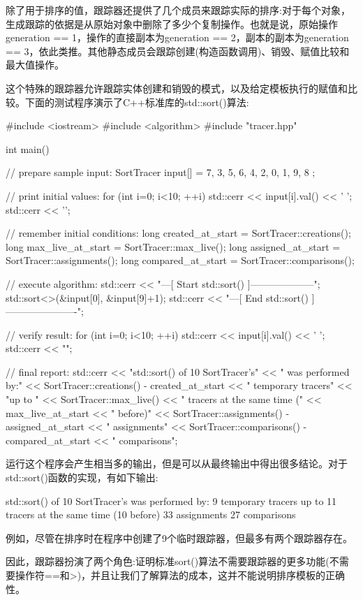 除了用于排序的值，跟踪器还提供了几个成员来跟踪实际的排序:对于每个对象，生成跟踪的依据是从原始对象中删除了多少个复制操作。也就是说，原始操作generation == 1，操作的直接副本为generation == 2，副本的副本为generation == 3，依此类推。其他静态成员会跟踪创建(构造函数调用)、销毁、赋值比较和最大值操作。

这个特殊的跟踪器允许跟踪实体创建和销毁的模式，以及给定模板执行的赋值和比较。下面的测试程序演示了C++标准库的std::sort()算法:

\begin{cpp}
#include <iostream>
#include <algorithm>
#include "tracer.hpp"

int main()
{
	// prepare sample input:
	SortTracer input[] = { 7, 3, 5, 6, 4, 2, 0, 1, 9, 8 };
	
	// print initial values:
	for (int i=0; i<10; ++i) {
		std::cerr << input[i].val() << ’ ’;
	}
	std::cerr << ’\n’;
	
	// remember initial conditions:
	long created_at_start = SortTracer::creations();
	long max_live_at_start = SortTracer::max_live();
	long assigned_at_start = SortTracer::assignments();
	long compared_at_start = SortTracer::comparisons();
	
	// execute algorithm:
	std::cerr << "---[ Start std::sort() ]--------------------\n";
	std::sort<>(&input[0], &input[9]+1);
	std::cerr << "---[ End std::sort() ]----------------------\n";
	
	// verify result:
	for (int i=0; i<10; ++i) {
		std::cerr << input[i].val() << ’ ’;
	}
	std::cerr << "\n\n";
	
	// final report:
	std::cerr << "std::sort() of 10 SortTracer’s"
			<< " was performed by:\n "
			<< SortTracer::creations() - created_at_start
			<< " temporary tracers\n "
			<< "up to "
			<< SortTracer::max_live()
			<< " tracers at the same time ("
			<< max_live_at_start << " before)\n "
			<< SortTracer::assignments() - assigned_at_start
			<< " assignments\n "
			<< SortTracer::comparisons() - compared_at_start
			<< " comparisons\n\n";
}
\end{cpp}

运行这个程序会产生相当多的输出，但是可以从最终输出中得出很多结论。对于std::sort()函数的实现，有如下输出:

\begin{shell}
std::sort() of 10 SortTracer’s was performed by:
 9 temporary tracers
 up to 11 tracers at the same time (10 before)
 33 assignments
 27 comparisons
\end{shell}

例如，尽管在排序时在程序中创建了9个临时跟踪器，但最多有两个跟踪器存在。

因此，跟踪器扮演了两个角色:证明标准sort()算法不需要跟踪器的更多功能(不需要操作符==和>)，并且让我们了解算法的成本，这并不能说明排序模板的正确性。




































